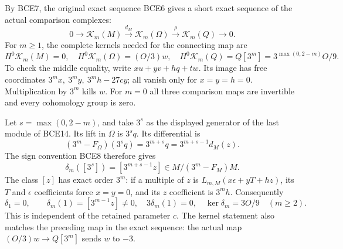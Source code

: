 By BCE7, the original exact sequence BCE6 gives a short exact
sequence of the actual comparison complexes:
\begin{equation}\tag{BCE13}
0\longrightarrow\mathcal K_m(M)
\xrightarrow{d_M}\mathcal K_m(\Omega)
\xrightarrow{\rho}\mathcal K_m(Q)\longrightarrow0 .
\end{equation}
For \(m\ge1\), the complete kernels needed for the connecting map are
\begin{equation}\tag{BCE14}
H^0\mathcal K_m(M)=0,\quad
H^0\mathcal K_m(\Omega)=(O/3)w,\quad
H^0\mathcal K_m(Q)=Q[3^m]
      =3^{\max(0,2-m)}O/9 .
\end{equation}
To check the middle equality, write \(xu+yv+hq+tw\).
Its image has free coordinates \(3^mx,\ 3^my,\ 3^mh-27cy\);
all vanish only for \(x=y=h=0\). Multiplication by \(3^m\)
kills \(w\). For \(m=0\) all three comparison maps are invertible
and every cohomology group is zero.

Let \(s=\max(0,2-m)\), and take \(3^s\) as the displayed generator
of the last module of BCE14. Its lift in \(\Omega\) is \(3^sq\).
Its differential is
\[
(3^m-F_\Omega)(3^sq)=3^{m+s}q
                  =3^{m+s-1}d_M(z).
\]
The sign convention BCE8 therefore gives
\begin{equation}\tag{BCE15}
\delta_m([3^s])=[3^{m+s-1}z]
             \in M/(3^m-F_M)M .
\end{equation}
The class \([z]\) has exact order \(3^m\): if a multiple of \(z\)
is \(L_{m,M}(x\epsilon+yT+hz)\), its \(T\) and \(\epsilon\)
coefficients force \(x=y=0\), and its \(z\) coefficient is
\(3^mh\). Consequently
\begin{equation}\tag{BCE16}
\delta_1=0,\qquad
\delta_m(1)=[3^{m-1}z]\ne0,\quad
3\delta_m(1)=0,\quad
\ker\delta_m=3O/9 \quad(m\ge2).
\end{equation}
This is independent of the retained parameter \(c\). The kernel
statement also matches the preceding map in the exact sequence:
the actual map \((O/3)w\to Q[3^m]\) sends \(w\) to \(-3\).


